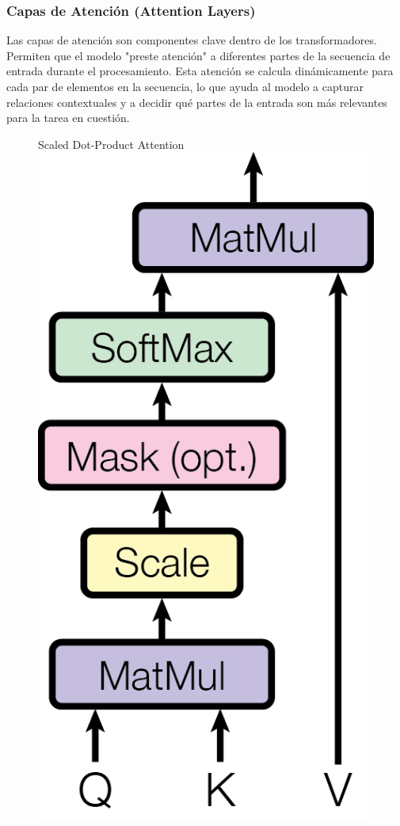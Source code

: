 \subsubsection{Capas de Atención (Attention Layers)}

   Las capas de atención son componentes clave dentro de los transformadores. Permiten que el modelo "preste atención" a diferentes partes de la secuencia de entrada durante el procesamiento. Esta atención se calcula dinámicamente para cada par de elementos en la secuencia, lo que ayuda al modelo a capturar relaciones contextuales y a decidir qué partes de la entrada son más relevantes para la tarea en cuestión.
\begin{figure}[H]
\begin{minipage}[f]{0.5\textwidth}
  \centering
  Scaled Dot-Product Attention \\
  \vspace{0.5cm}
  \includegraphics[scale=0.6]{plantilla-libro/ModalNet-19.png}

\end{minipage}
\end{figure}
